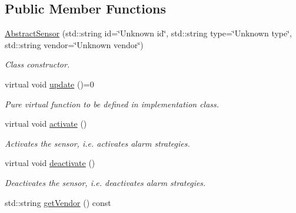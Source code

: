 \subsection*{Public Member Functions}
\begin{DoxyCompactItemize}
\item 
\hyperlink{classAbstractSensor_a6ce9232e9b428879bcdee6591eba55e6}{Abstract\+Sensor} (std\+::string id=\char`\"{}Unknown id\char`\"{}, std\+::string type=\char`\"{}Unknown type\char`\"{}, std\+::string vendor=\char`\"{}Unknown vendor\char`\"{})
\begin{DoxyCompactList}\small\item\em Class constructor. \end{DoxyCompactList}\item 
virtual void \hyperlink{classAbstractSensor_a8d0a1908c6aaf67fc7d781e54b49293b}{update} ()=0\hypertarget{classAbstractSensor_a8d0a1908c6aaf67fc7d781e54b49293b}{}\label{classAbstractSensor_a8d0a1908c6aaf67fc7d781e54b49293b}

\begin{DoxyCompactList}\small\item\em Pure virtual function to be defined in implementation class. \end{DoxyCompactList}\item 
virtual void \hyperlink{classAbstractSensor_a0071c6499b1538713bb46d07f0b30ca1}{activate} ()\hypertarget{classAbstractSensor_a0071c6499b1538713bb46d07f0b30ca1}{}\label{classAbstractSensor_a0071c6499b1538713bb46d07f0b30ca1}

\begin{DoxyCompactList}\small\item\em Activates the sensor, i.\+e. activates alarm strategies. \end{DoxyCompactList}\item 
virtual void \hyperlink{classAbstractSensor_a7f921f96118605def806c40139f5496b}{deactivate} ()\hypertarget{classAbstractSensor_a7f921f96118605def806c40139f5496b}{}\label{classAbstractSensor_a7f921f96118605def806c40139f5496b}

\begin{DoxyCompactList}\small\item\em Deactivates the sensor, i.\+e. deactivates alarm strategies. \end{DoxyCompactList}\item 
std\+::string \hyperlink{classAbstractSensor_a2786a5387ea8a90f8451cb3a64a3e152}{get\+Vendor} () const \hypertarget{classAbstractSensor_a2786a5387ea8a90f8451cb3a64a3e152}{}\label{classAbstractSensor_a2786a5387ea8a90f8451cb3a64a3e152}


\end{DoxyCompactItemize}
